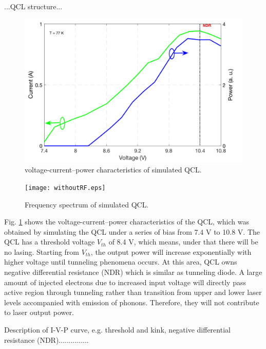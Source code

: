 \documentclass[11pt,final]{scrbook}
\begin{document}
...QCL structure...

\begin{figure}[htbp]
\begin{center}
\includegraphics[scale=0.6]{IVCURVE.pdf}
\caption{voltage-current–power characteristics of simulated QCL.}
\label{fig:IVcurve}
\end{center}
\end{figure}

\begin{figure}[htbp]
\begin{center}
\texttt{[image: withoutRF.eps]}
\caption{Frequency spectrum of simulated QCL.}
\label{fig:withoutRF}
\end{center}
\end{figure}

Fig. \ref{fig:IVcurve} shows the voltage-current–power characteristics of the QCL, which was obtained by simulating the QCL under a series of bias from 7.4 V to 10.8 V. The QCL has a threshold voltage $V_{th}$ of 8.4 V, which means, under that there will be no lasing. Starting from $V_{th}$, the output power will increase exponentially with higher voltage until tunneling phenomena occurs. At this area, QCL owns negative differential resistance (NDR) which is similar as tunneling diode. A large amount of injected electrons due to increased input voltage will directly pass active region through tunneling rather than transition from upper and lower laser levels accompanied with emission of phonons. Therefore, they will not contribute to laser output power.

Description of I-V-P curve, e.g. threshold and kink, negative differential resistance (NDR)...............
\end{document}
